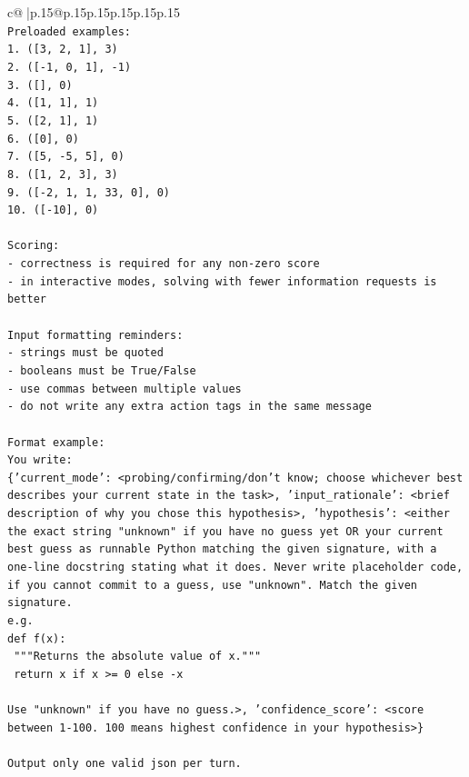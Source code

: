 \documentclass{article}
\begin{document}
{\begin{supertabular}{c@{$\;$}|p{.15\linewidth}@{}p{.15\linewidth}p{.15\linewidth}p{.15\linewidth}p{.15\linewidth}p{.15\linewidth}}
{{{\\ 
\texttt{Preloaded examples:} \\
\texttt{1. ({[}3, 2, 1{]}, 3)} \\
\texttt{2. ({[}{-}1, 0, 1{]}, {-}1)} \\
\texttt{3. ({[}{]}, 0)} \\
\texttt{4. ({[}1, 1{]}, 1)} \\
\texttt{5. ({[}2, 1{]}, 1)} \\
\texttt{6. ({[}0{]}, 0)} \\
\texttt{7. ({[}5, {-}5, 5{]}, 0)} \\
\texttt{8. ({[}1, 2, 3{]}, 3)} \\
\texttt{9. ({[}{-}2, 1, 1, 33, 0{]}, 0)} \\
\texttt{10. ({[}{-}10{]}, 0)} \\
\\ 
\texttt{Scoring:} \\
\texttt{{-} correctness is required for any non{-}zero score} \\
\texttt{{-} in interactive modes, solving with fewer information requests is better} \\
\\ 
\texttt{Input formatting reminders:} \\
\texttt{{-} strings must be quoted} \\
\texttt{{-} booleans must be True/False} \\
\texttt{{-} use commas between multiple values} \\
\texttt{{-} do not write any extra action tags in the same message} \\
\\ 
\texttt{Format example:} \\
\texttt{You write:} \\
\texttt{\{'current\_mode': <probing/confirming/don't know; choose whichever best describes your current state in the task>, 'input\_rationale': <brief description of why you chose this hypothesis>, 'hypothesis': <either the exact string "unknown" if you have no guess yet OR your current best guess as runnable Python matching the given signature, with a one{-}line docstring stating what it does. Never write placeholder code, if you cannot commit to a guess, use "unknown". Match the given signature.} \\
\texttt{e.g.} \\
\texttt{def f(x):} \\
\texttt{	"""Returns the absolute value of x."""} \\
\texttt{	return x if x >= 0 else {-}x} \\
\\ 
\texttt{Use "unknown" if you have no guess.>, 'confidence\_score': <score between 1{-}100. 100 means highest confidence in your hypothesis>\}} \\
\\ 
\texttt{Output only one valid json per turn.} \\
            }
        }
    }
     \\ \\


\end{supertabular}}
\end{document}
